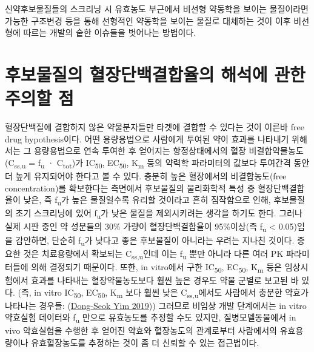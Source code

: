 \documentclass[
  11pt,
  krantz2, a4paper, twoside]{krantz}
\theoremstyle{definition}
\theoremstyle{definition}
\theoremstyle{definition}
\theoremstyle{definition}
\theoremstyle{remark}
\begin{document}
신약후보물질들의 스크리닝 시 유효농도 부근에서 비선형 약동학을 보이는 물질이라면 가능한 구조변경 등을 통해 선형적인 약동학을 보이는 물질로 대체하는 것이 이후 비선형에 따르는 개발의 숱한 이슈들을 벗어나는 방법이다.

\hypertarget{uxd6c4uxbcf4uxbb3cuxc9c8uxc758-uxd608uxc7a5uxb2e8uxbc31uxacb0uxd569uxc728uxc758-uxd574uxc11duxc5d0-uxad00uxd55c-uxc8fcuxc758uxd560-uxc810}{%
\section{후보물질의 혈장단백결합율의 해석에 관한 주의할 점}\label{uxd6c4uxbcf4uxbb3cuxc9c8uxc758-uxd608uxc7a5uxb2e8uxbc31uxacb0uxd569uxc728uxc758-uxd574uxc11duxc5d0-uxad00uxd55c-uxc8fcuxc758uxd560-uxc810}}

혈장단백질에 결합하지 않은 약물분자들만 타겟에 결합할 수 있다는 것이 이른바 free drug hypothesis이다.
어떤 용량용법으로 사람에게 투여된 약이 효과를 나타내기 위해서는 그 용량용법으로 연속 투여한 후 얻어지는 항정상태에서의 혈장 비결합약물농도(C\textsubscript{ss,u} = f\textsubscript{u} · C\textsubscript{tot})가 IC\textsubscript{50}, EC\textsubscript{50}, K\textsubscript{m} 등의 약력학 파라미터의 값보다 투여간격 동안 더 높게 유지되어야 한다고 볼 수 있다.
충분히 높은 혈장에서의 비결합농도(free concentration)를 확보한다는 측면에서 후보물질의 물리화학적 특성 중 혈장단백결합율이 낮은, 즉 f\textsubscript{u}가 높은 물질일수록 유리할 것이라고 흔히 짐작함으로 인해, 후보물질의 초기 스크리닝에 있어 f\textsubscript{u}가 낮은 물질을 제외시키려는 생각을 하기도 한다.
그러나 실제 시판 중인 약 성분들의 30\% 가량이 혈장단백결합율이 95\%이상(즉 f\textsubscript{u} \textless{} 0.05)임을 감안하면, 단순히 f\textsubscript{u}가 낮다고 좋은 후보물질이 아니라는 우려는 지나친 것이다.
중요한 것은 치료용량에서 확보되는 C\textsubscript{ss,u}인데 이는 f\textsubscript{u} 뿐만 아니라 다른 여러 PK 파라미터들에 의해 결정되기 때문이다. 또한, in vitro에서 구한 IC\textsubscript{50}, EC\textsubscript{50}, K\textsubscript{m} 등은 임상시험에서 효과를 나타내는 혈장약물농도보다 훨씬 높은 경우도 약물 군별로 보고된 바 있다.
(즉, in vitro IC\textsubscript{50}, EC\textsubscript{50}, K\textsubscript{m} 보다 훨씬 낮은 C\textsubscript{ss,u}에서도 사람에서 충분한 약효가 나타나는 경우들: (\protect\hyperlink{ref-yim2019potency}{Dong-Seok Yim 2019}))
그러므로 비임상 개발 단계에서는 in vitro 약효실험 데이터와 f\textsubscript{u} 만으로 유효농도를 추정할 수도 있지만, 질병모델동물에서 in vivo 약효실험을 수행한 후 얻어진 약효와 혈장농도의 관계로부터 사람에서의 유효용량이나 유효혈장농도를 추정하는 것이 좀 더 신뢰할 수 있는 접근법이다.
\end{document}
